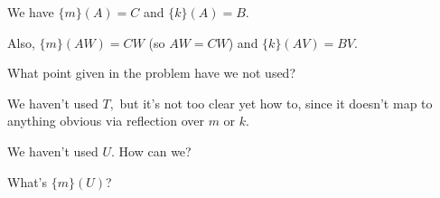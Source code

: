 

We have $\{m\} (A) = C$ and $\{k\} (A) = B$.

Also, $\{m\} (AW) = CW$ (so $AW = CW$) and $\{k\} (AV) = BV.$

What point given in the problem have we not used?









We haven't used $T,$ but it's not too clear yet how to, since it doesn't map to anything obvious via reflection over $m$ or $k.$



We haven't used $U.$  How can we?

What's $\{m\}(U)$?





